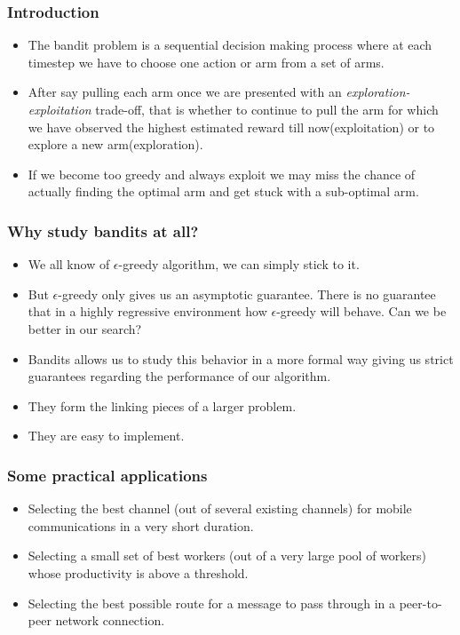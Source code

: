 \begin{frame}
\frametitle{Introduction}
\begin{itemize}
\item<1-> The bandit problem is a sequential decision making process where at each timestep we have to choose one action or arm from a set of arms. 
\item<2-> After say pulling each arm once we are presented with an \emph{exploration-exploitation}  trade-off, that is whether to continue to pull the arm for which we have observed the highest estimated reward till now(exploitation) or to explore a new arm(exploration). 
\item<3-> If we become too greedy and always exploit we may miss the chance of actually finding the optimal arm and get stuck with a sub-optimal arm.
\end{itemize}
\end{frame}

\begin{frame}
\frametitle{Why study bandits at all?}
\begin{itemize}
\item<1-> We all know of $\epsilon$-greedy algorithm, we can simply stick to it.
\item<2-> But $\epsilon$-greedy only gives us an asymptotic guarantee. There is no guarantee that in a highly regressive environment how $\epsilon$-greedy will behave. Can we be better in our search?
\item<3-> Bandits allows us to study this behavior in a more formal way giving us strict guarantees regarding the performance of our algorithm.
\item<4-> They form the linking pieces of a larger problem.
\item<5-> They are easy to implement.    
\end{itemize}
\end{frame}

\begin{frame}
\frametitle{Some practical applications}
\begin{itemize}
\item<1-> Selecting the best channel (out of several existing channels) for mobile communications in a very short duration.
\item<2-> Selecting a small set of best workers (out of a very large pool of workers) whose productivity is above a threshold.
\item<3-> Selecting the best possible route for a message to pass through in a peer-to-peer network connection.
\end{itemize}
\end{frame}
